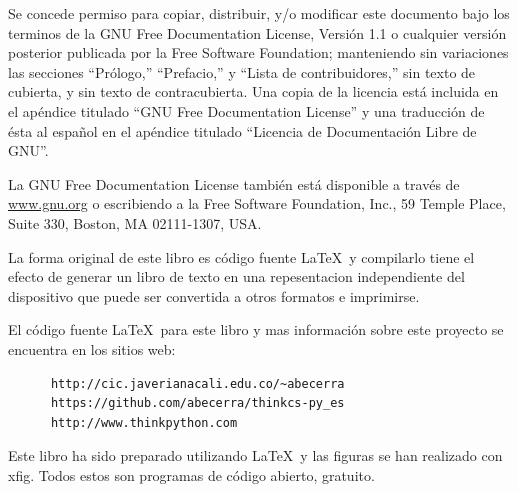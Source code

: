 Se concede permiso para copiar, distribuir, y/o modificar este documento bajo
los terminos de la GNU Free Documentation License, Versión 1.1 o cualquier
versión posterior publicada por la Free Software Foundation; manteniendo 
sin variaciones las secciones ``Prólogo,'' ``Prefacio,'' y ``Lista de contribuidores,''
sin texto de cubierta, y sin texto de contracubierta. Una copia de la licencia
está incluida en el apéndice titulado ``GNU Free Documentation License'' y una 
traducción de ésta al español en el apéndice titulado ``Licencia de Documentación Libre de GNU''.

La GNU Free Documentation License también está disponible a través de \url{www.gnu.org}
o escribiendo a la Free Software Foundation, Inc., 59 Temple Place,
Suite 330, Boston, MA 02111-1307, USA.

La forma original de este libro es código fuente \LaTeX\  y compilarlo
tiene el efecto de generar un libro de texto en una 
repesentacion independiente del dispositivo que puede ser convertida a otros 
formatos e imprimirse.

El código  fuente \LaTeX\  para este libro y mas información sobre este proyecto
se encuentra en los sitios web:

\begin{verbatim}
      http://cic.javerianacali.edu.co/~abecerra
      https://github.com/abecerra/thinkcs-py_es
      http://www.thinkpython.com
\end{verbatim}

Este libro ha sido preparado utilizando \LaTeX\ y las figuras
se han realizado con xfig.  Todos estos son programas de código
abierto, gratuito.

\vspace{0.25in}
\newpage
\thispagestyle{empty}

